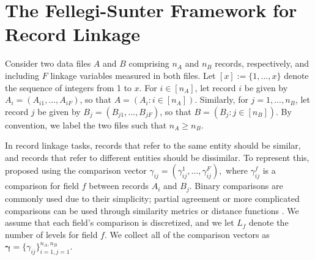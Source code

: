 \documentclass[12pt,letterpaper]{article}
\newcommand{\1}[1]{\mathbb{I}\!\left[#1\right]} %
\begin{document}
\section{The Fellegi-Sunter Framework for Record Linkage}\label{sec:prior-work}

Consider two data files $A$ and $B$ comprising $n_A$ and $n_B$ records, respectively, and including $F$ linkage variables measured in both files. Let $[x] := \{1, \ldots, x\}$ denote the sequence of integers from 1 to $x$. For $i \in [n_A]$, let record $i$ be given by $A_i = (A_{i1}, \dots, A_{iF})$, so that $A = (A_i : i \in [n_A])$.  Similarly, for $j=1, \dots, n_B$, let record $j$ be given by $B_j = (B_{j1}, \dots, B_{jF})$, so that $B = (B_j : j \in [n_B])$. By convention, we label the two files such that $n_A \geq n_B$.

In record linkage tasks, records that refer to the same entity should be similar, and records that refer to different entities should be dissimilar. To represent this, \cite{fellegi_theory_1969} proposed using the comparison vector $\gamma_{ij} = (\gamma_{ij}^1, \ldots, \gamma_{ij}^F),$ where $\gamma_{ij}^f$ is a comparison for field $f$ between records $A_i$ and $B_j$. Binary comparisons are commonly used due to their simplicity; partial agreement or more complicated comparisons can be used through similarity metrics or distance functions \citep{Winkler_1990, Bilenko_2003_adapt, elmagarmid_duplicate_2007}. We assume that each field's comparison is discretized, and we let $L_f$ denote the number of levels for field $f$. We collect all of the comparison vectors as $\bm{\gamma}=\{\gamma_{ij}\}_{i=1,j=1}^{n_A,n_B}$.
\end{document}
